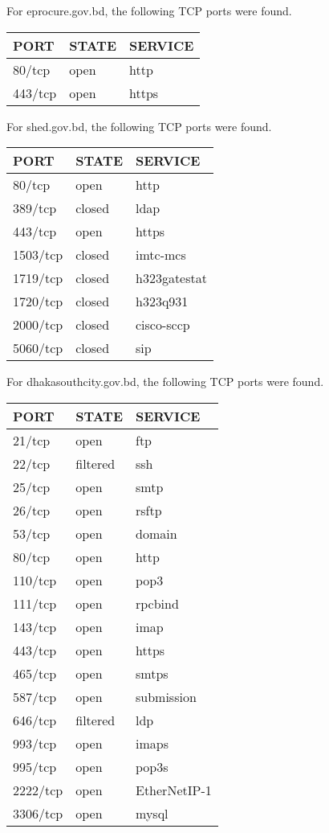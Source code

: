 \documentclass[11pt]{article}
\begin{document}
For eprocure.gov.bd, the following TCP ports were found.\\
\begin{center}
\begin{tabular}{lll}
PORT & STATE & SERVICE\\
\hline
80/tcp & open & http\\
443/tcp & open & https\\
\end{tabular}
\end{center}

For shed.gov.bd, the following TCP ports were found.\\
\begin{center}
\begin{tabular}{lll}
PORT & STATE & SERVICE\\
\hline
80/tcp & open & http\\
389/tcp & closed & ldap\\
443/tcp & open & https\\
1503/tcp & closed & imtc-mcs\\
1719/tcp & closed & h323gatestat\\
1720/tcp & closed & h323q931\\
2000/tcp & closed & cisco-sccp\\
5060/tcp & closed & sip\\
\end{tabular}
\end{center}

For dhakasouthcity.gov.bd, the following TCP ports were found.\\
\begin{center}
\begin{tabular}{lll}
PORT & STATE & SERVICE\\
\hline
21/tcp & open & ftp\\
22/tcp & filtered & ssh\\
25/tcp & open & smtp\\
26/tcp & open & rsftp\\
53/tcp & open & domain\\
80/tcp & open & http\\
110/tcp & open & pop3\\
111/tcp & open & rpcbind\\
143/tcp & open & imap\\
443/tcp & open & https\\
465/tcp & open & smtps\\
587/tcp & open & submission\\
646/tcp & filtered & ldp\\
993/tcp & open & imaps\\
995/tcp & open & pop3s\\
2222/tcp & open & EtherNetIP-1\\
3306/tcp & open & mysql\\
\end{tabular}
\end{center}
\end{document}
